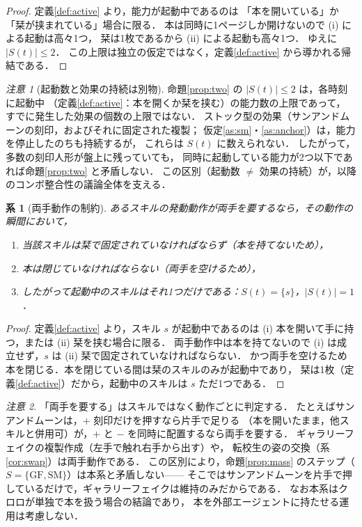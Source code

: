 \documentclass[a4paper,12pt]{jarticle}
\theoremstyle{definition}
\theoremstyle{plain}
\newtheorem{cor}{系}
\theoremstyle{definition}
\theoremstyle{remark}
\newtheorem*{remark}{注意}
\newcommand{\Act}{S}   %
\newcommand{\GF}{\mathrm{GF}}    %
\newcommand{\SM}{\mathrm{SM}}    %
\begin{document}
\begin{proof}
定義\ref{def:active} より，能力が起動中であるのは
「本を開いている」か「栞が挟まれている」場合に限る．
本は同時に1ページしか開けないので (i) による起動は高々1つ，
栞は1枚であるから (ii) による起動も高々1つ．
ゆえに $|\Act(t)|\le 2$．
この上限は独立の仮定ではなく，定義\ref{def:active} から導かれる帰結である．
\end{proof}

\begin{remark}[起動数と効果の持続は別物]
命題\ref{prop:two} の $|\Act(t)|\le2$ は，各時刻に起動中
（定義\ref{def:active}：本を開くか栞を挟む）の能力数の上限であって，
すでに発生した効果の個数の上限ではない．
ストック型の効果（サンアンドムーンの刻印，およびそれに固定された複製；
仮定\ref{as:sm}・\ref{as:anchor}）は，能力を停止したのちも持続するが，
これらは $\Act(t)$ に数えられない．
したがって，多数の刻印人形が盤上に残っていても，
同時に{起動}している能力が2つ以下であれば命題\ref{prop:two} と矛盾しない．
この区別（起動数 $\neq$ 効果の持続）が，以降のコンボ整合性の議論全体を支える．
\end{remark}

\begin{cor}[両手動作の制約]\label{cor:twohands}
あるスキルの発動動作が両手を要するなら，その動作の瞬間において，
\begin{enumerate}
\item[(1)] 当該スキルは栞で固定されていなければならず（本を持てないため），
\item[(2)] 本は閉じていなければならない（両手を空けるため），
\item[(3)] したがって起動中のスキルはそれ1つだけである：$\Act(t)=\{s\}$，$|\Act(t)|=1$．
\end{enumerate}
\end{cor}

\begin{proof}
定義\ref{def:active} より，スキル $s$ が起動中であるのは
(i) 本を開いて手に持つ，または (ii) 栞を挟む場合に限る．
両手動作中は本を持てないので (i) は成立せず，$s$ は (ii) 栞で固定されていなければならない．
かつ両手を空けるため本を閉じる．本を閉じている間は栞のスキルのみが起動中であり，
栞は1枚（定義\ref{def:active}）だから，起動中のスキルは $s$ ただ1つである．
\end{proof}

\begin{remark}
「両手を要する」はスキルではなく動作ごとに判定する．
たとえばサンアンドムーンは，$+$ 刻印だけを押すなら片手で足りる
（本を開いたまま，他スキルと併用可）が，$+$ と $-$ を同時に配置するなら両手を要する．
ギャラリーフェイクの複製作成（左手で触れ右手から出す）や，
転校生の姿の交換（系\ref{cor:swap}）は両手動作である．
この区別により，命題\ref{prop:mass} のステップ（$\Act=\{\GF,\SM\}$）は本系と矛盾しない——
そこではサンアンドムーンを片手で押しているだけで，ギャラリーフェイクは維持のみだからである．
なお本系はクロロが単独で本を扱う場合の結論であり，
本を外部エージェントに持たせる運用は考慮しない．
\end{remark}
\end{document}

